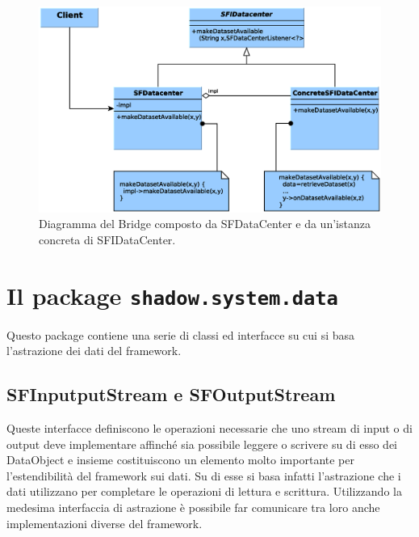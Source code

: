 \begin{figure}
\begin{center}
\includegraphics[width=\textwidth]{Immagini/DataCenter}
\caption[Bridge composto da SFDataCenter e SFIDataCenter]{Diagramma del Bridge composto da SFDataCenter e da un'istanza concreta di SFIDataCenter.\label{f:datacenterimplementation}} 
\end{center} 
\end{figure}


\section{Il package \texttt{shadow.system.data}}
\label{sec:shadow_system_data}
Questo package contiene una serie di classi ed interfacce su cui si basa l'astrazione dei dati del framework.

\subsection{SFInputputStream e SFOutputStream}
\label{sub:sfinoutstream}
Queste interfacce definiscono le operazioni necessarie che uno stream di input o di output deve implementare affinch\'e sia possibile leggere o scrivere su di esso dei DataObject e insieme costituiscono un elemento molto importante per l'estendibilit\`a del framework sui dati. Su di esse si basa infatti l'astrazione che i dati utilizzano per completare le operazioni di lettura e scrittura. Utilizzando la medesima interfaccia di astrazione \`e possibile far comunicare tra loro anche implementazioni diverse del framework.

